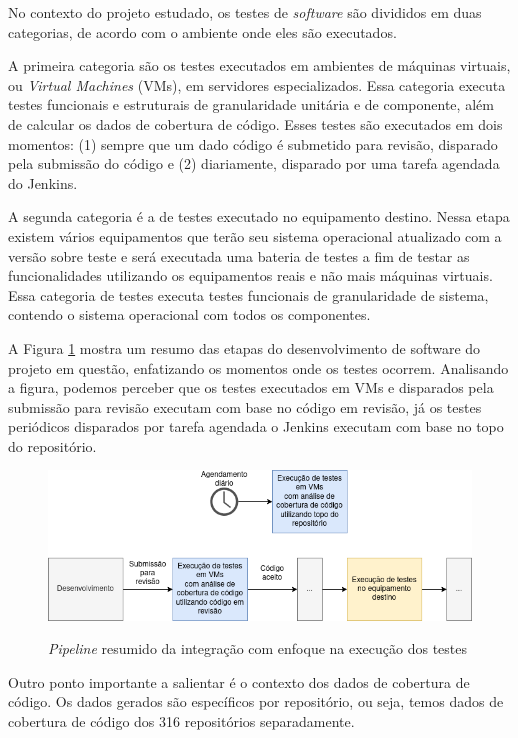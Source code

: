 \documentclass[11.5pt]{article}
\begin{document}
No contexto do projeto estudado, os testes de \textit{software} são divididos em duas categorias, de
acordo com o ambiente onde eles são executados.

A primeira categoria são os testes executados em ambientes de máquinas virtuais, ou
\textit{Virtual Machines} (VMs), em servidores especializados.
Essa categoria executa testes funcionais e estruturais de granularidade unitária e de componente,
além de calcular os dados de cobertura de código.
Esses testes são executados em dois momentos:
(1) sempre que um dado código é submetido para revisão, disparado pela submissão do código e
(2) diariamente, disparado por uma tarefa agendada do Jenkins.

A segunda categoria é a de testes executado no equipamento destino.
Nessa etapa existem vários equipamentos que terão seu sistema operacional atualizado com a versão
sobre teste e será executada uma bateria de testes a fim de testar as funcionalidades utilizando
os equipamentos reais e não mais máquinas virtuais.
Essa categoria de testes executa testes funcionais de granularidade de sistema, contendo o sistema
operacional com todos os componentes.

A Figura \ref{fig:pipeline_tests} mostra um resumo das etapas do desenvolvimento de software do
projeto em questão, enfatizando os momentos onde os testes ocorrem.
Analisando a figura, podemos perceber que os testes executados em VMs e disparados pela submissão
para revisão executam com base no código em revisão, já os testes periódicos disparados por tarefa
agendada o Jenkins executam com base no topo do repositório.

\begin{figure}[ht]
    \centering
    \includegraphics[width=1.0\textwidth]{pipeline_tests.png}
    \label{fig:pipeline_tests}
    \caption{\textit{Pipeline} resumido da integração com enfoque na execução dos testes}
\end{figure}

Outro ponto importante a salientar é o contexto dos dados de cobertura de código.
Os dados gerados são específicos por repositório, ou seja, temos dados de cobertura de código dos
316 repositórios separadamente.
\end{document}
